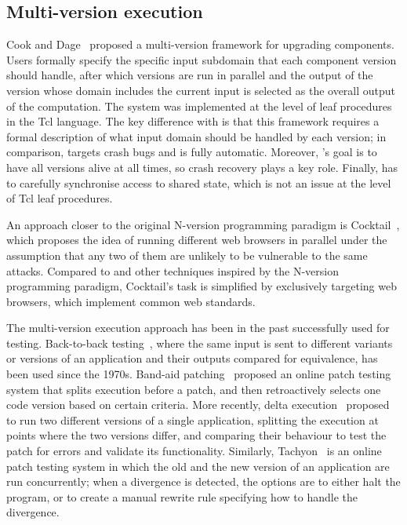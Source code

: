 \subsection{Multi-version execution}

Cook and Dage~\cite{cook:icse99} proposed a multi-version framework for
upgrading components.  Users formally specify the specific input subdomain that
each component version should handle, after which versions are run in parallel
and the output of the version whose domain includes the current input is
selected as the overall output of the computation.  The system was implemented
at the level of leaf procedures in the Tcl language.  The key difference with
\mx is that this framework requires a formal description of what input domain
should be handled by each version; in comparison, \mx targets crash bugs and is
fully automatic.  Moreover, \mx's goal is to have all versions alive at all
times, so crash recovery plays a key role.  Finally, \mx has to carefully
synchronise access to shared state, which is not an issue at the level of Tcl
leaf procedures.

An approach closer to the original N-version programming paradigm is
Cocktail~\cite{cocktail}, which proposes the idea of running different web
browsers in parallel under the assumption that any two of them are unlikely to
be vulnerable to the same attacks.  Compared to \mx and other techniques
inspired by the N-version programming paradigm, Cocktail's task is simplified
by exclusively targeting web browsers, which implement common web standards.


The multi-version execution approach has been in the past successfully used for
testing. Back-to-back testing~\cite{back-to-back90}, where the same input is
sent to different variants or versions of an application and their outputs
compared for equivalence, has been used since the 1970s.  Band-aid
patching~\cite{bandaid-patch07} proposed an online patch testing system that
splits execution before a patch, and then retroactively selects one code
version based on certain criteria.  More recently, delta
execution~\cite{onlinevalidation} proposed to run two different versions of a
single application, splitting the execution at points where the two versions
differ, and comparing their behaviour to test the patch for errors and validate
its functionality.  Similarly, Tachyon~\cite{tachyon12} is an online patch
testing system
in which the old and the new version of an application are run concurrently;
when a divergence is detected, the options are to either halt the program, or
to create a manual rewrite rule specifying how to handle the divergence.

